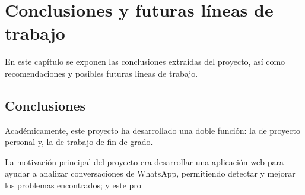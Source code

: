 \chapter{Conclusiones y futuras líneas de trabajo}
\label{chap:conclusions}

En este capítulo se exponen las conclusiones extraídas del proyecto, así como recomendaciones y posibles futuras líneas de trabajo.

\section{Conclusiones}
\label{sec:conclusions}


Académicamente, este proyecto ha desarrollado una doble función: la de proyecto personal y, la de trabajo de fin de grado.

La motivación principal del proyecto era desarrollar una aplicación web para ayudar a analizar conversaciones de WhatsApp, permitiendo detectar y mejorar los problemas encontrados; y este pro

